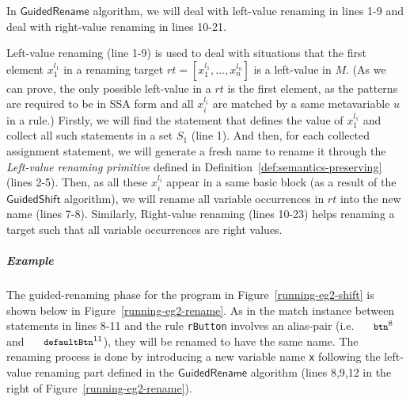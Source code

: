 \documentclass[a4paper, USenglish]{lipics-v2016}
\newcommand{\code}[1]{\texttt{\footnotesize #1}}
\theoremstyle{plain}
\begin{document}
In $\mathsf{GuidedRename}$ algorithm, we will deal with left-value renaming in lines 1-9 and deal with right-value renaming in lines 10-21. 

Left-value renaming (line 1-9) is used to deal with situations that the first element $x_1^{l_1}$ in a renaming target $\mathit{rt}=[x_{1}^{l_1},...,x_n^{l_n}]$ is a left-value in $M$. (As we can prove, the only possible left-value in a $rt$ is the first element, as the patterns are required to be in SSA form and all $x_i^{l_i}$ are matched by a same metavariable $u$ in a rule.) Firstly, we will find the statement that defines the value of $x_1^{l_1}$ and collect all such statements in a set $S_1$ (line 1). And then, for each collected assignment statement, we will generate a fresh name to rename it through the \emph{Left-value renaming primitive} defined in Definition~\ref{def:semantics-preserving} (lines 2-5). Then, as all these $x_i^{l_i}$ appear in a same basic block (as a result of the $\mathsf{GuidedShift}$ algorithm), we will rename all variable occurrences in $\mathit{rt}$ into the new name (lines 7-8). Similarly, Right-value renaming (lines 10-23) helps renaming a target such that all variable occurrences are right values.


\subparagraph*{Example} The guided-renaming phase for the program in Figure~\ref{running-eg2-shift} is shown below in Figure~\ref{running-eg2-rename}. As in the match instance between statements in lines 8-11 and the rule \code{rButton} involves an alias-pair (i.e. $\code{btn}^8$ and $\code{defaultBtn}^{11}$), they will be renamed to have the same name. The renaming process is done by introducing a new variable name \code{x} following the left-value renaming part defined in the $\mathsf{GuidedRename}$ algorithm (lines 8,9,12 in the right of Figure~\ref{running-eg2-rename}). 
\end{document}
